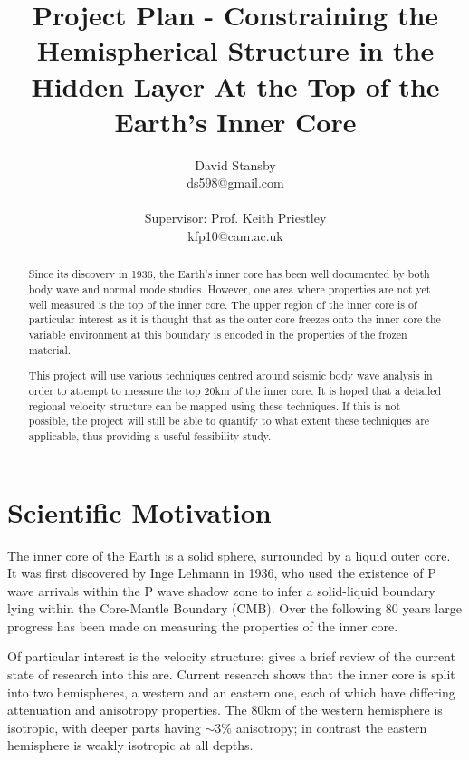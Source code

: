 \documentclass[11pt,a4paper]{article}
\begin{document}
\title{Project Plan - Constraining the Hemispherical Structure in the Hidden Layer At the Top of the Earth's Inner Core}
\author{David Stansby \\ ds598@gmail.com \\  \\ Supervisor: Prof. Keith Priestley \\ kfp10@cam.ac.uk }
\maketitle

\begin{abstract}
Since its discovery in 1936, the Earth's inner core has been well documented by both body wave and normal mode studies. However, one area where properties are not yet well measured is the top of the inner core. The upper region of the inner core is of particular interest as it is thought that as the outer core freezes onto the inner core the variable environment at this boundary is encoded in the properties of the frozen material. 

This project will use various techniques centred around seismic body wave analysis in order to attempt to measure the top 20km of the inner core. It is hoped that a detailed regional velocity structure can be mapped using these techniques. If this is not possible, the project will still be able to quantify to what extent these techniques are applicable, thus providing a useful feasibility study.
\end{abstract}

\section{Scientific Motivation}
The inner core of the Earth is a solid sphere, surrounded by a liquid outer core. It was first discovered by Inge Lehmann in 1936, who used the existence of P wave arrivals within the P wave shadow zone to infer a solid-liquid boundary lying within the Core-Mantle Boundary (CMB). Over the following 80 years large progress has been made on measuring the properties of the inner core.

Of particular interest is the velocity structure; \cite{Deuss2014} gives a brief review of the current state of research into this are. Current research shows that the inner core is split into two hemispheres, a western and an eastern one, each of which have differing attenuation and anisotropy properties. The 80km of the western hemisphere is isotropic, with deeper parts having $\sim 3\% $ anisotropy; in contrast the eastern hemisphere is weakly isotropic at all depths.
\end{document}
